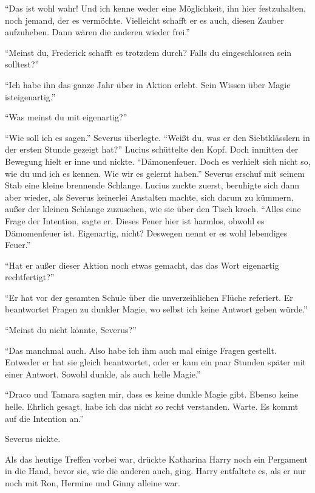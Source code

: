 \enquote{Das ist wohl wahr! Und ich kenne weder eine Möglichkeit, ihn hier festzuhalten, noch jemand, der es vermöchte. Vielleicht schafft er es auch, diesen Zauber aufzuheben. Dann wären die anderen wieder frei.}

\enquote{Meinst du, Frederick schafft es trotzdem durch? Falls du eingeschlossen sein solltest?}

\enquote{Ich habe ihn das ganze Jahr über in Aktion erlebt. Sein Wissen über Magie ist\abs eigenartig.}

\enquote{Was meinst du mit eigenartig?}

\enquote{Wie soll ich es sagen.} Severus überlegte. \enquote{Weißt du, was er den Siebtklässlern in der ersten Stunde gezeigt hat?} Lucius schüttelte den Kopf. Doch inmitten der Bewegung hielt er inne und nickte. \enquote{Dämonenfeuer. Doch es verhielt sich nicht so, wie du und ich es kennen. Wie wir es gelernt haben.} Severus erschuf mit seinem Stab eine kleine brennende Schlange. Lucius zuckte zuerst, beruhigte sich dann aber wieder, als Severus keinerlei Anstalten machte, sich darum zu kümmern, außer der kleinen Schlange zuzusehen, wie sie über den Tisch kroch. \enquote{Alles eine Frage der Intention, sagte er. Dieses Feuer hier ist harmlos, obwohl es Dämomenfeuer ist. Eigenartig, nicht? Deswegen nennt er es wohl lebendiges Feuer.}

\enquote{Hat er außer dieser Aktion noch etwas gemacht, das das Wort eigenartig rechtfertigt?}

\enquote{Er hat vor der gesamten Schule über die unverzeihlichen Flüche referiert. Er beantwortet Fragen zu dunkler Magie, wo selbst ich keine Antwort geben würde.}

\enquote{Meinst du nicht könnte, Severus?}

\enquote{Das manchmal auch. Also habe ich ihm auch mal einige Fragen gestellt. Entweder er hat sie gleich beantwortet, oder er kam ein paar Stunden später mit einer Antwort. Sowohl dunkle, als auch helle Magie.}

\enquote{Draco und Tamara sagten mir, dass es keine dunkle Magie gibt. Ebenso keine helle. Ehrlich gesagt, habe ich das nicht so recht verstanden. \gst Warte. Es kommt auf die Intention an.}

Severus nickte.

\trenn

Als das heutige Treffen vorbei war, drückte Katharina Harry noch ein Pergament in die Hand, bevor sie, wie die anderen auch, ging. Harry entfaltete es, als er nur noch mit Ron, Hermine und Ginny alleine war.

